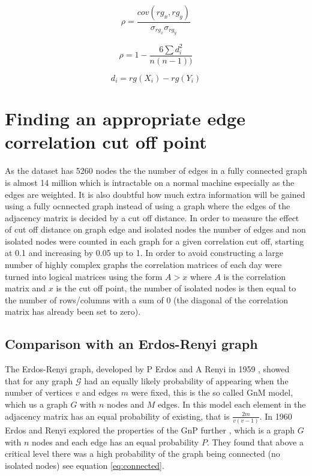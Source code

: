 \begin{equation}
\label{eq:spearmans1}
    \rho = \frac{cov(rg_x,rg_y)}{\sigma_{rg_x}\sigma_{rg_y}}
\end{equation}

\begin{equation}
\label{eq:spearmans2}
    \rho = 1- \frac{6 \sum d_i^2}{n(n-1))}
\end{equation}

\begin{equation}
\label{eq:spearmans3}
    d_i = rg(X_i)-rg(Y_i)
\end{equation}

\section{Finding an appropriate  edge correlation cut off point}
As the dataset has 5260 nodes the the number of edges in a fully connected graph is almost 14 million which is intractable on a normal machine especially as the edges are weighted. It is also doubtful how much extra information will be gained using a fully ocnnected graph instead of using a graph where the edges of the adjacency matrix is decided by a cut off distance. In order to measure the effect of cut off distance on graph edge and isolated nodes the number of edges and non isolated nodes were counted in each graph for a given correlation cut off, starting at 0.1 and increasing by 0.05 up to 1. In order to avoid constructing a large number of highly complex graphs the correlation matrices of each day were turned into logical matrices using the form $A>x$ where $A$ is the correlation matrix and $x$ is the cut off point, the number of isolated nodes is then equal to the number of rows/columns with a sum of 0 (the diagonal of the correlation matrix has already been set to zero).

\subsection{Comparison with an Erdos-Renyi graph}
The Erdos-Renyi graph, developed by P Erdos and A Renyi in 1959 \cite{erdos1959}, showed that for any graph $\mathcal{G}$ had an equally likely probability of appearing when the number of vertices $v$ and edges $m$ were fixed, this is the so called GnM model, which us a graph $G$ with $n$ nodes and $M$ edges. In this model each element in the adjacency matrix has an equal probability of existing, that is $\frac{2m}{v(v-1)}$. In 1960 Erdos and Renyi explored the properties of the GnP further \cite{erds1960}, which is a graph $G$ with $n$ nodes and each edge has an equal probability $P$. They found that above a critical level there was a high probability of the graph being connected (no isolated nodes) see equation \ref{eq:connected}. 

